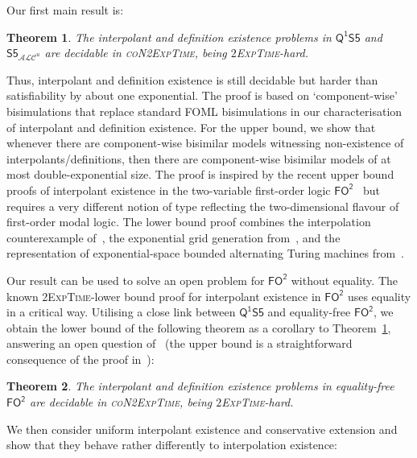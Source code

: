 \documentclass[10pt,a4paper]{amsart}
\theoremstyle{plain}
\newtheorem{thm}{Theorem}[section]
\theoremstyle{definition}
\newcommand{\nb}[1]{\textcolor{red}{\bf!}%
	\marginpar[\parbox{15mm}{\raggedleft\scriptsize\textcolor{red}{#1}}]%
	{\parbox{15mm}{\raggedright\scriptsize\textcolor{red}{#1}}}}
\newcommand{\FOT}{\ensuremath{\mathsf{FO^2}}}
\newcommand{\FOMS}{\ensuremath{\mathsf{Q^1S5}}}
\newcommand{\ALCS}{\ensuremath{\mathsf{S5}_{\mathcal{ALC}^u}}}
\begin{document}
Our first main result is:

\begin{thm}\label{thm1intro}
The interpolant and definition existence problems in \FOMS{} and \ALCS{} are decidable in \textsc{coN2ExpTime}, being $2$\textsc{ExpTime}-hard.
\end{thm}

Thus, interpolant and definition existence is still decidable but harder than satisfiability by about one exponential. The proof is based on `component-wise' bisimulations that replace standard FOML bisimulations in our characterisation of interpolant and definition existence. For the upper bound, we show that whenever there are component-wise bisimilar models 
witnessing non-existence of interpolants/definitions, then there are component-wise bisimilar models of at most double-exponential size. The proof is inspired by the recent upper bound proofs of interpolant existence in the two-variable first-order logic \FOT{}~\cite{DBLP:conf/lics/JungW21} but requires a very different notion of type reflecting the two-dimensional flavour of first-order modal logic. 
The lower bound proof combines the interpolation counterexample  of~\cite{DBLP:journals/ndjfl/MarxA98}, the exponential grid generation from~\cite{DBLP:conf/time/HodkinsonKKWZ03,DBLP:journals/tocl/GollerJL15}, and the representation of exponential-space bounded alternating Turing machines from~\cite{DBLP:conf/lics/JungW21}. 

Our result can be used to solve an open problem for $\FOT{}$ without equality. The known 2\textsc{ExpTime}-lower bound proof for interpolant existence in $\FOT{}$ uses equality in a critical way. Utilising a close link
between \FOMS{} and equality-free \FOT{}, we obtain the lower bound of the following theorem as a corollary to Theorem~\ref{thm1intro}, answering an open question of~\cite{DBLP:conf/lics/JungW21}
(the upper bound is a straightforward consequence of the proof in~\cite{DBLP:conf/lics/JungW21}):

\begin{thm}\label{thm2intro}
The interpolant and definition existence problems in equality-free \FOT{} 
are decidable in \textsc{coN2\-Exp\-Time}, being $2$\textsc{ExpTime}-hard.
\end{thm}

We then consider uniform interpolant existence and conservative extension and show that they behave rather differently to interpolation existence:
\end{document}
